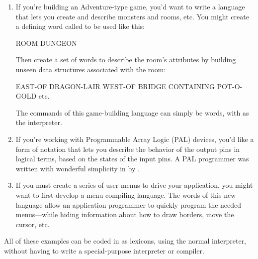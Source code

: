 \begin{enumerate}
\item If you're building an Adventure-type game, you'd want to write a
language that lets you create and describe monsters and rooms, etc. You
might create a defining word called  to be used like this:

\begin{Code}
ROOM DUNGEON
\end{Code}
Then create a set of words to describe the room's attributes by building
unseen data structures associated with the room:

\begin{Code}
EAST-OF DRAGON-LAIR
WEST-OF BRIDGE
CONTAINING POT-O-GOLD
etc.
\end{Code}
The commands of this game-building language can simply be \Forth{}
words, with \Forth{} as the interpreter.

\item If you're working with Programmable Array Logic (PAL) devices,
you'd like a form of notation that lets you describe the behavior of
the output pins in logical terms, based on the states of the input
pins. A PAL programmer was written with wonderful simplicity in
\Forth{} by  \cite{stolowitz82}.

\item If you must create a series of user menus to drive your application,
you might want to first develop a menu-compiling language. The words of
this new language allow an application programmer to quickly program the
needed menus---while hiding information about how to draw borders, move
the cursor, etc.
\end{enumerate}
All of these examples can be coded in \Forth{} as lexicons, using the
normal \Forth{} interpreter, without having to write a special-purpose
interpreter or compiler.

